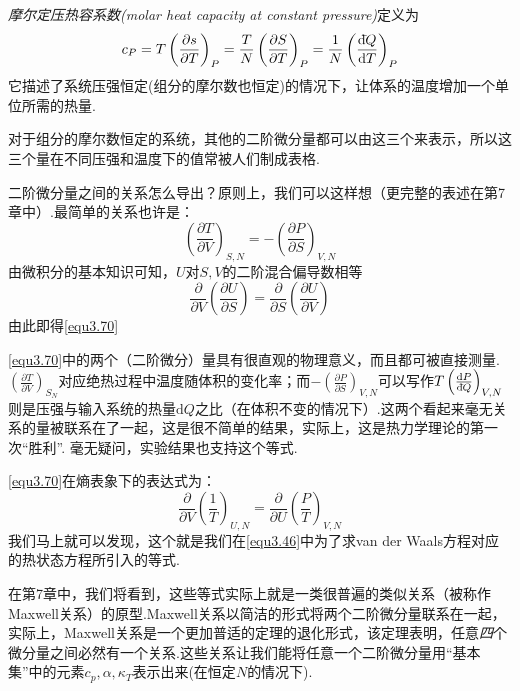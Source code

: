 {\it 摩尔定压热容系数(molar heat capacity at constant pressure)}定义为
\begin{equation}
\label{equ3.69}
c_P=T\left(\frac{\partial s}{\partial T}\right)_P=\frac{T}{N}\left(\frac{\partial S}{\partial T}\right)_P=\frac{1}{N}\left(\frac{\mathrm d\hspace*{-0.1em}\bar{}\hspace*{0.08em} Q}{\text{d}T}\right)_P
\end{equation}
它描述了系统压强恒定(组分的摩尔数也恒定)的情况下，让体系的温度增加一个单位所需的热量.

对于组分的摩尔数恒定的系统，其他的二阶微分量都可以由这三个来表示，所以这三个量在不同压强和温度下的值常被人们制成表格.

二阶微分量之间的关系怎么导出？原则上，我们可以这样想（更完整的表述在第7章中）.最简单的关系也许是：
\begin{equation}
\label{equ3.70}
\left(\frac{\partial T}{\partial V}\right)_{S,N}=-\left(\frac{\partial P}{\partial S}\right)_{V,N}
\end{equation}
由微积分的基本知识可知，$U$对$S,V$的二阶混合偏导数相等
\begin{equation}
\label{3.71}
\frac{\partial}{\partial V}\left(\frac{\partial U}{\partial S}\right)=\frac{\partial}{\partial S}\left(\frac{\partial U}{\partial V}\right)
\end{equation}
由此即得\eqref{equ3.70}

\eqref{equ3.70}中的两个（二阶微分）量具有很直观的物理意义，而且都可被直接测量. $\left(\frac{\partial T}{\partial V}\right)_{S_N}$对应绝热过程中温度随体积的变化率；而$-\left(\frac{\partial P}{\partial S}\right)_{V,N}$可以写作$T\left(\frac{\text{d} P}{\mathrm d\hspace*{-0.1em}\bar{}\hspace*{0.08em} Q}\right)_{V,N}$则是压强与输入系统的热量$\text{d}Q$之比（在体积不变的情况下）.这两个看起来毫无关系的量被联系在了一起，这是很不简单的结果，实际上，这是热力学理论的第一次“胜利”. 毫无疑问，实验结果也支持这个等式.

\eqref{equ3.70}在熵表象下的表达式为：
\begin{equation}
\label{equ3.72}
\frac{\partial }{\partial V}\left(\frac{1}{T}\right)_{U,N}=\frac{\partial }{\partial U}\left(\frac{P}{T}\right)_{V,N}
\end{equation}
我们马上就可以发现，这个就是我们在\eqref{equ3.46}中为了求van der Waals方程对应的热状态方程所引入的等式.

在第7章中，我们将看到，这些等式实际上就是一类很普遍的类似关系（被称作Maxwell关系）的原型.Maxwell关系以简洁的形式将两个二阶微分量联系在一起，实际上，Maxwell关系是一个更加普适的定理的退化形式，该定理表明，任意{\it 四}个微分量之间必然有一个关系.这些关系让我们能将任意一个二阶微分量用“基本集”中的元素$c_p,\alpha,\kappa_T$表示出来(在恒定$N$的情况下).

